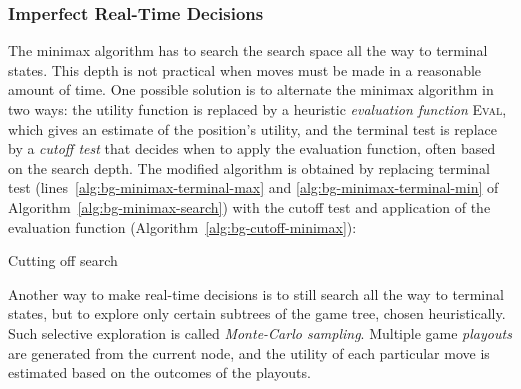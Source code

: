 \subsubsection{Imperfect Real-Time Decisions}

The minimax algorithm has to search the search space all the way
to terminal states. This depth is not practical when moves must be
made in a reasonable amount of time. One possible solution is to
alternate the minimax algorithm in two ways: the utility function is
replaced by a heuristic {\em evaluation function} \textsc{Eval}, which gives an
estimate of the position's utility, and the terminal test is replace
by a {\em cutoff test} that decides when to apply the evaluation
function, often based on the search depth.  The modified algorithm is
obtained by replacing terminal test (lines~\ref{alg:bg-minimax-terminal-max} 
and \ref{alg:bg-minimax-terminal-min} of Algorithm~\ref{alg:bg-minimax-search})
with the cutoff test and application of the evaluation function
(Algorithm~\ref{alg:bg-cutoff-minimax}): 
\begin{algorithm}
\caption{Cutting off search}
\label{alg:bg-cutoff-minimax}
\begin{algorithmic}[1]
     \State \Return {}
  \EndIf
\end{algorithmic}
\end{algorithm}

Another way to make real-time decisions is to still search all the
way to terminal states, but to explore only certain
subtrees of the game tree, chosen heuristically. Such selective
exploration is called {\em Monte-Carlo sampling}. Multiple game {\em
  playouts} are generated from the current node, and the utility of
each particular move is estimated based on the outcomes of the
playouts. 
